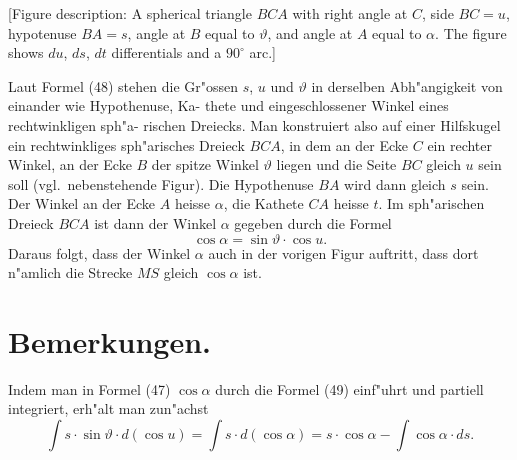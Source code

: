 \documentclass[12pt,a4paper]{article}
\theoremstyle{plain}
\theoremstyle{definition}
\theoremstyle{remark}
\begin{document}
[Figure description: A spherical triangle $BCA$ with right angle at $C$, side $BC = u$, hypotenuse $BA = s$, angle at $B$ equal to $\vartheta$, and angle at $A$ equal to $\alpha$. The figure shows $du$, $ds$, $dt$ differentials and a $90^\circ$ arc.]

Laut Formel (48) stehen die Gr"ossen $s$, $u$ und $\vartheta$ in
derselben Abh"angigkeit von einander wie Hypothenuse, Ka-
thete und eingeschlossener Winkel eines rechtwinkligen sph"a-
rischen Dreiecks. Man konstruiert also auf einer Hilfskugel
ein rechtwinkliges sph"arisches Dreieck $BCA$, in dem
an der Ecke $C$ ein rechter Winkel, an der Ecke $B$ der
spitze Winkel $\vartheta$ liegen und die Seite $BC$ gleich $u$ sein soll
(vgl.\ nebenstehende Figur). Die Hypothenuse $BA$ wird dann
gleich $s$ sein. Der Winkel an der Ecke $A$ heisse $\alpha$, die
Kathete $CA$ heisse $t$. Im sph"arischen Dreieck $BCA$ ist
dann der Winkel $\alpha$ gegeben durch die Formel
\begin{equation}\tag{49}
\cos \alpha = \sin \vartheta \cdot \cos u.
\end{equation}
Daraus folgt, dass der Winkel $\alpha$ auch in der vorigen Figur auftritt, dass dort n"amlich die Strecke $MS$
gleich $\cos \alpha$ ist.

\newpage
\section*{Bemerkungen.}

Indem man in Formel (47) $\cos \alpha$ durch die Formel (49) einf"uhrt und partiell integriert, erh"alt man
zun"achst
\begin{equation}\tag{50}
\int\! s \cdot \sin \vartheta \cdot d(\cos u) = \int\! s \cdot d(\cos \alpha) = s \cdot \cos \alpha - \int\! \cos \alpha \cdot ds.
\end{equation}
\end{document}
